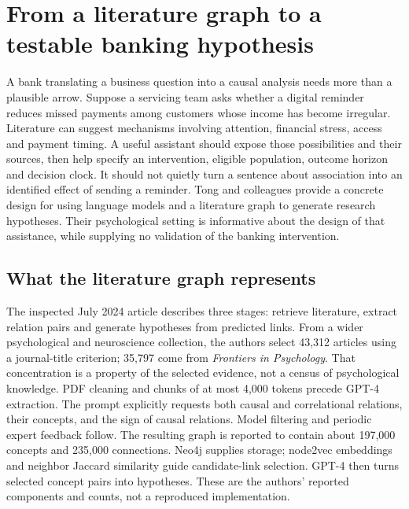 \section{From a literature graph to a testable banking hypothesis}
\label{exec20:hypothesis-scope}
A bank translating a business question into a causal analysis needs more than a plausible arrow. Suppose a servicing team asks whether a digital reminder reduces missed payments among customers whose income has become irregular. Literature can suggest mechanisms involving attention, financial stress, access and payment timing. A useful assistant should expose those possibilities and their sources, then help specify an intervention, eligible population, outcome horizon and decision clock. It should not quietly turn a sentence about association into an identified effect of sending a reminder. Tong and colleagues provide a concrete design for using language models and a literature graph to generate research hypotheses. Their psychological setting is informative about the design of that assistance, while supplying no validation of the banking intervention.~\citep{exec20_hypothesis_generation}

\subsection{What the literature graph represents}
\label{exec20:hypothesis-claims}
The inspected July 2024 article describes three stages: retrieve literature, extract relation pairs and generate hypotheses from predicted links. From a wider psychological and neuroscience collection, the authors select 43,312 articles using a journal-title criterion; 35,797 come from \emph{Frontiers in Psychology}. That concentration is a property of the selected evidence, not a census of psychological knowledge. PDF cleaning and chunks of at most 4,000 tokens precede GPT-4 extraction. The prompt explicitly requests both causal and correlational relations, their concepts, and the sign of causal relations. Model filtering and periodic expert feedback follow. The resulting graph is reported to contain about 197,000 concepts and 235,000 connections. Neo4j supplies storage; node2vec embeddings and neighbor Jaccard similarity guide candidate-link selection. GPT-4 then turns selected concept pairs into hypotheses. These are the authors' reported components and counts, not a reproduced implementation.~\citep{exec20_hypothesis_generation}

